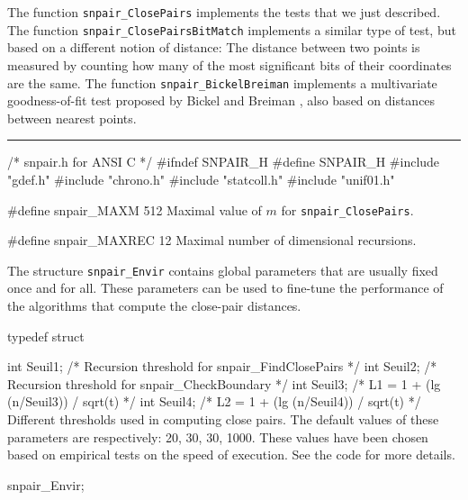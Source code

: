 The function {\tt snpair\_ClosePairs} implements the tests that we
just described.  The function {\tt snpair\_ClosePairsBitMatch}
implements a similar type of test, but based on a different notion of
distance: The distance between two points is measured by counting
how many of the most significant bits of their coordinates are the same.
The function {\tt snpair\_BickelBreiman} implements a multivariate
goodness-of-fit test proposed by Bickel and Breiman \cite{tBIC83a},
also based on distances between nearest points.


\bigskip\hrule

\code\hide
/* snpair.h  for ANSI C */
#ifndef SNPAIR_H
#define SNPAIR_H
\endhide
#include "gdef.h"
#include "chrono.h"
#include "statcoll.h"
#include "unif01.h"
\endcode




\code


#define snpair_MAXM 512
\endcode
\tab
  Maximal value of $m$ for  {\tt snpair\_ClosePairs}.
\endtab
\code


#define snpair_MAXREC 12
\endcode
\tab
 Maximal number of dimensional recursions.
\endtab

\ifdetailed  %


The structure {\tt snpair\_Envir} contains global parameters 
that are usually fixed once and for all.
These parameters can be used to fine-tune the performance of
the algorithms that compute the close-pair distances.

\code

typedef struct {

   int Seuil1;        /* Recursion threshold for snpair_FindClosePairs */
   int Seuil2;        /* Recursion threshold for snpair_CheckBoundary  */
   int Seuil3;        /* L1 = 1 + (lg (n/Seuil3)) / sqrt(t) */
   int Seuil4;        /* L2 = 1 + (lg (n/Seuil4)) / sqrt(t) */
\endcode
 \tabb
  Different thresholds used in computing close pairs.
  The default values of these parameters are respectively:
  20, 30, 30, 1000.  These values have been chosen based on 
  empirical  tests on the speed of execution.
  See the code for more details.
 \endtabb
\code

} snpair_Envir;


